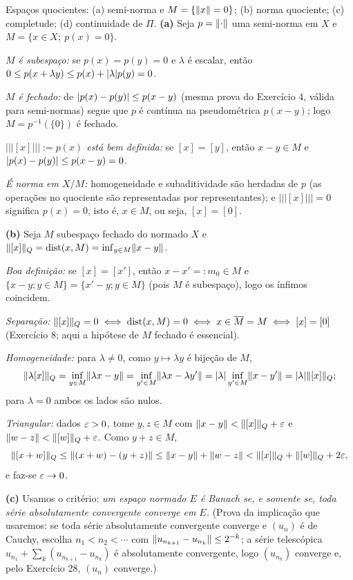 \begin{exercicio}{Espaços quocientes: (a) semi-norma e $M=\{\lVert x\rVert=0\}$; (b) norma quociente; (c) completude; (d) continuidade de $\Pi$.}
\sol
\textbf{(a)} Seja $p=\lVert\cdot\rVert$ uma semi-norma em $X$ e $M=\{x\in X;\ p(x)=0\}$.

\emph{$M$ é subespaço:} se $p(x)=p(y)=0$ e $\lambda$ é escalar, então $0\le p(x+\lambda y)\le p(x)+\lvert\lambda\rvert p(y)=0$.

\emph{$M$ é fechado:} de $\lvert p(x)-p(y)\rvert\le p(x-y)$ (mesma prova do Exercício 4, válida para semi-normas) segue que $p$ é contínua na pseudométrica $p(x-y)$; logo $M=p^{-1}(\{0\})$ é fechado.

\emph{$\vert\!\vert\!\vert[x]\vert\!\vert\!\vert:=p(x)$ está bem definida:} se $[x]=[y]$, então $x-y\in M$ e $\lvert p(x)-p(y)\rvert\le p(x-y)=0$.

\emph{É norma em $X/M$:} homogeneidade e subaditividade são herdadas de $p$ (as operações no quociente são representadas por representantes); e $\vert\!\vert\!\vert[x]\vert\!\vert\!\vert=0$ significa $p(x)=0$, isto é, $x\in M$, ou seja, $[x]=[0]$.

\textbf{(b)} Seja $M$ subespaço fechado do normado $X$ e $\lVert[x]\rVert_Q=\operatorname{dist}(x,M)=\inf_{y\in M}\lVert x-y\rVert$.

\emph{Boa definição:} se $[x]=[x']$, então $x-x'=:m_0\in M$ e $\{x-y;y\in M\}=\{x'-y;y\in M\}$ (pois $M$ é subespaço), logo os ínfimos coincidem.

\emph{Separação:} $\lVert[x]\rVert_Q=0\iff\operatorname{dist}(x,M)=0\iff x\in\overline{M}=M\iff[x]=[0]$ (Exercício 8; aqui a hipótese de $M$ fechado é essencial).

\emph{Homogeneidade:} para $\lambda\neq0$, como $y\mapsto\lambda y$ é bijeção de $M$,
\[ \lVert\lambda[x]\rVert_Q=\inf_{y\in M}\lVert\lambda x-y\rVert=\inf_{y'\in M}\lVert\lambda x-\lambda y'\rVert=\lvert\lambda\rvert\inf_{y'\in M}\lVert x-y'\rVert=\lvert\lambda\rvert\lVert[x]\rVert_Q; \]
para $\lambda=0$ ambos os lados são nulos.

\emph{Triangular:} dados $\varepsilon>0$, tome $y,z\in M$ com $\lVert x-y\rVert<\lVert[x]\rVert_Q+\varepsilon$ e $\lVert w-z\rVert<\lVert[w]\rVert_Q+\varepsilon$. Como $y+z\in M$,
\[ \lVert[x+w]\rVert_Q\le\lVert(x+w)-(y+z)\rVert\le\lVert x-y\rVert+\lVert w-z\rVert<\lVert[x]\rVert_Q+\lVert[w]\rVert_Q+2\varepsilon, \]
e faz-se $\varepsilon\to0$.

\textbf{(c)} Usamos o critério: \emph{um espaço normado $E$ é Banach se, e somente se, toda série absolutamente convergente converge em $E$.} (Prova da implicação que usaremos: se toda série absolutamente convergente converge e $(u_n)$ é de Cauchy, escolha $n_1<n_2<\cdots$ com $\lVert u_{n_{k+1}}-u_{n_k}\rVert\le2^{-k}$; a série telescópica $u_{n_1}+\sum_k(u_{n_{k+1}}-u_{n_k})$ é absolutamente convergente, logo $(u_{n_k})$ converge e, pelo Exercício 28, $(u_n)$ converge.)


\end{exercicio}

